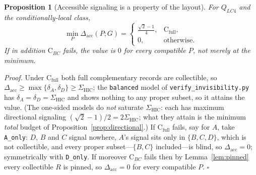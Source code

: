 \documentclass[10pt,twocolumn]{article}
\newtheorem{proposition}{Proposition}
\newcommand{\Sig}{\Sigma_{\mathrm{HIC}}}
\newcommand{\Dacc}{\Delta_{\mathrm{acc}}}
\newcommand{\CBC}{\mathrm{C}_{BC}}
\newcommand{\CFull}{\mathrm{C}_{\mathrm{full}}}
\begin{document}
\begin{proposition}[Accessible signaling is a property of the layout]
\label{prop:access}
For $Q_{LC4}$ and the conditionally-local class,
\[
\min_P \Dacc(P;G) =
\begin{cases}
\tfrac{\sqrt2-1}{4}, & \CFull,\\[2pt]
0, & \text{otherwise.}
\end{cases}
\]
If in addition $\CBC$ fails, the value is $0$ for \emph{every} compatible $P$, not merely at the minimum.
\end{proposition}

\noindent\emph{Proof.} Under $\CFull$ both full complementary records are collectible, so $\Dacc\ge\max\{\delta_A,\delta_D\}\ge\Sig$; the \texttt{balanced} model of \texttt{verify\_invisibility.py} has $\delta_A=\delta_D=\Sig$ and shows nothing to any proper subset, so it attains the value. (The one-sided models do \emph{not} saturate $\Sig$: each has maximum directional signaling $(\sqrt2-1)/2=2\Sig$; what they attain is the minimum \emph{total} budget of Proposition~\ref{prop:directional}.) If $\CFull$ fails, say for $A$, take \texttt{A\_only}: $D$, $B$ and $C$ signal nowhere, $A$'s signal sits only in $\{B,C,D\}$, which is not collectible, and every proper subset---$\{B,C\}$ included---is blind, so $\Dacc=0$; symmetrically with \texttt{D\_only}. If moreover $\CBC$ fails then by Lemma~\ref{lem:pinned} every collectible $R$ is pinned, so $\Dacc=0$ for every compatible $P$. $\square$
\end{document}
